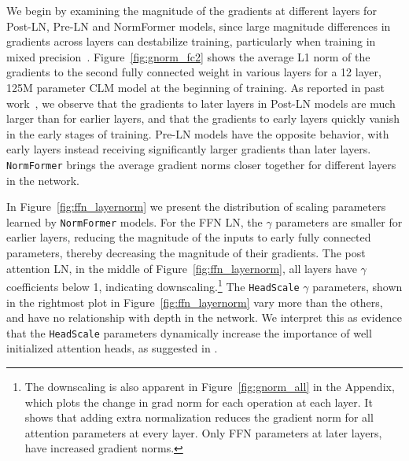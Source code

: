 \documentclass{article} %
\begin{document}
We begin by examining the magnitude of the gradients at different layers for Post-LN, Pre-LN and NormFormer models, since large magnitude differences in gradients across layers can destabilize training, particularly when training in mixed precision~\citep{micikevicius2018mixed}.
Figure~\ref{fig:gnorm_fc2} shows the average L1 norm of the gradients to the second fully connected weight in various layers for a 12 layer, 125M parameter CLM model at the beginning of training.
As reported in past work~\citep{xiong2020layer}, we observe that the gradients to later layers in Post-LN models are much larger than for earlier layers, and that the gradients to early layers quickly vanish in the early stages of training.
Pre-LN models have the opposite behavior, with early layers instead receiving significantly larger gradients than later layers.
\texttt{NormFormer} brings the average gradient norms closer together for different layers in the network.


In Figure~\ref{fig:ffn_layernorm} we present the distribution of scaling parameters learned by \texttt{NormFormer} models.
For the FFN LN, the $\gamma$ parameters are smaller for earlier layers, reducing the magnitude of the inputs to early fully connected parameters, thereby decreasing the magnitude of their gradients.
The post attention LN, in the middle of Figure~\ref{fig:ffn_layernorm}, all layers have $\gamma$ coefficients below 1, indicating downscaling.\footnote{The downscaling is also apparent in Figure~\ref{fig:gnorm_all} in the Appendix, which plots the change in grad norm for each operation at each layer. It shows that adding extra normalization reduces the gradient norm for all attention parameters at every layer. Only FFN parameters at later layers, have increased gradient norms.} The \texttt{HeadScale} $\gamma$ parameters, shown in the rightmost plot in Figure~\ref{fig:ffn_layernorm} vary more than the others, and have no relationship with depth in the network. We interpret this as evidence that the \texttt{HeadScale} parameters dynamically increase the importance of well initialized attention heads, as suggested in \citet{chen2021earlybert}.
\end{document}
